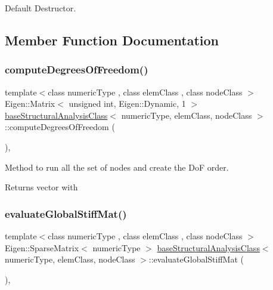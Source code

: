 Default Destructor. 

\subsection{Member Function Documentation}
\mbox{\label{classbase_structural_analysis_class_aca53b1f1642a1dae799df8f906479f93}} 
\subsubsection{\texorpdfstring{compute\+Degrees\+Of\+Freedom()}{computeDegreesOfFreedom()}}
{\footnotesize\ttfamily template$<$class numeric\+Type , class elem\+Class , class node\+Class $>$ \\
Eigen\+::\+Matrix$<$ unsigned int, Eigen\+::\+Dynamic, 1 $>$ \mbox{\hyperlink{classbase_structural_analysis_class}{base\+Structural\+Analysis\+Class}}$<$ numeric\+Type, elem\+Class, node\+Class $>$\+::compute\+Degrees\+Of\+Freedom (\begin{DoxyParamCaption}{ }\end{DoxyParamCaption})\hspace{0.3cm}{\ttfamily [protected]}, {\ttfamily [virtual]}}

Method to run all the set of nodes and create the DoF order. \begin{DoxyReturn}{Returns}
vector with 
\end{DoxyReturn}
\mbox{\label{classbase_structural_analysis_class_a773fa080feae6b17e47e58e5ed810885}} 
\subsubsection{\texorpdfstring{evaluate\+Global\+Stiff\+Mat()}{evaluateGlobalStiffMat()}}
{\footnotesize\ttfamily template$<$class numeric\+Type , class elem\+Class , class node\+Class $>$ \\
Eigen\+::\+Sparse\+Matrix$<$ numeric\+Type $>$ \mbox{\hyperlink{classbase_structural_analysis_class}{base\+Structural\+Analysis\+Class}}$<$ numeric\+Type, elem\+Class, node\+Class $>$\+::evaluate\+Global\+Stiff\+Mat (\begin{DoxyParamCaption}{ }\end{DoxyParamCaption})\hspace{0.3cm}{\ttfamily [protected]}, {\ttfamily [virtual]}}

